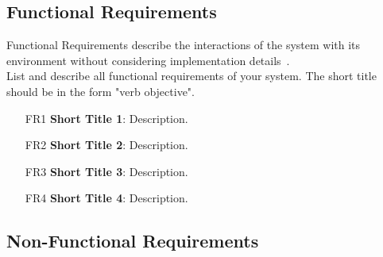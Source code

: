 \subsection*{Functional Requirements}

\begin{tcolorbox}[breakable]
	Functional Requirements describe the interactions of the system with its environment without considering implementation details~\cite{bruegge2013object}.
	\\
	List and describe all functional requirements of your system.
	The short title should be in the form "verb objective". 
\end{tcolorbox}

\begin{itemize}[itemindent=-4pt, leftmargin=34pt, align=left]
    \item[FR1] \textbf{Short Title 1}: Description.
    \item[FR2] \textbf{Short Title 2}: Description.
    \item[FR3] \textbf{Short Title 3}: Description.
    \item[FR4] \textbf{Short Title 4}: Description.
\end{itemize}


\subsection*{Non-Functional Requirements}


